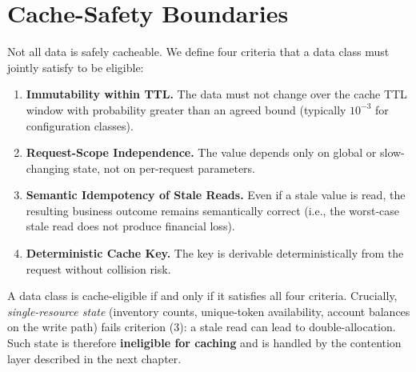 \section{Cache-Safety Boundaries}
\label{sec:safety}
Not all data is safely cacheable. We define four criteria that a data class must jointly satisfy to be eligible:

\begin{enumerate}[leftmargin=*]
    \item \textbf{Immutability within TTL.} The data must not change over the cache TTL window with probability greater than an agreed bound (typically $10^{-3}$ for configuration classes).
    \item \textbf{Request-Scope Independence.} The value depends only on global or slow-changing state, not on per-request parameters.
    \item \textbf{Semantic Idempotency of Stale Reads.} Even if a stale value is read, the resulting business outcome remains semantically correct (i.e., the worst-case stale read does not produce financial loss).
    \item \textbf{Deterministic Cache Key.} The key is derivable deterministically from the request without collision risk.
\end{enumerate}

A data class is cache-eligible if and only if it satisfies all four criteria. Crucially, \emph{single-resource state} (inventory counts, unique-token availability, account balances on the write path) fails criterion (3): a stale read can lead to double-allocation. Such state is therefore \textbf{ineligible for caching} and is handled by the contention layer described in the next chapter.

